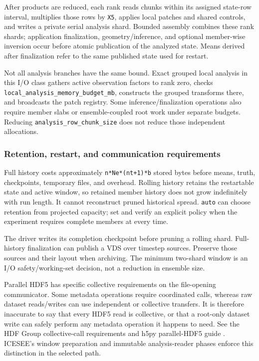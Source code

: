 \documentclass[11pt,a4paper]{article}
\newcommand{\code}[1]{\nolinkurl{#1}}
\begin{document}
After products are reduced, each rank reads chunks within its assigned state-row interval, multiplies those rows by \code{X5}, applies local patches and shared controls, and writes a private serial analysis shard. Bounded assembly combines these rank shards; application finalization, geometry/inference, and optional member-wise inversion occur before atomic publication of the analyzed state. Means derived after finalization refer to the same published state used for restart.


Not all analysis branches have the same bound. Exact grouped local analysis in this I/O class gathers active observation factors to rank zero, checks \code{local_analysis_memory_budget_mb}, constructs the grouped transforms there, and broadcasts the patch registry. Some inference/finalization operations also require member slabs or ensemble-coupled root work under separate budgets. Reducing \code{analysis_row_chunk_size} does not reduce those independent allocations.

\subsubsection{Retention, restart, and communication requirements}

Full history costs approximately \code{n*Ne*(nt+1)*b} stored bytes before means, truth, checkpoints, temporary files, and overhead. Rolling history retains the restartable state and active window, so retained member history does not grow indefinitely with run length. It cannot reconstruct pruned historical spread. \code{auto} can choose retention from projected capacity; set and verify an explicit policy when the experiment requires complete members at every time.

The driver writes its completion checkpoint before pruning a rolling shard. Full-history finalization can publish a VDS over timestep sources. Preserve those sources and their layout when archiving. The minimum two-shard window is an I/O safety/working-set decision, not a reduction in ensemble size.

Parallel HDF5 has specific collective requirements on the file-opening communicator. Some metadata operations require coordinated calls, whereas raw dataset reads/writes can use independent or collective transfers. It is therefore inaccurate to say that every HDF5 read is collective, or that a root-only dataset write can safely perform any metadata operation it happens to need. See the HDF Group collective-call requirements \citep{hdf5collective} and h5py parallel-HDF5 guide \citep{h5pympi}. ICESEE's window preparation and immutable analysis-reader phases enforce this distinction in the selected path.
\end{document}
